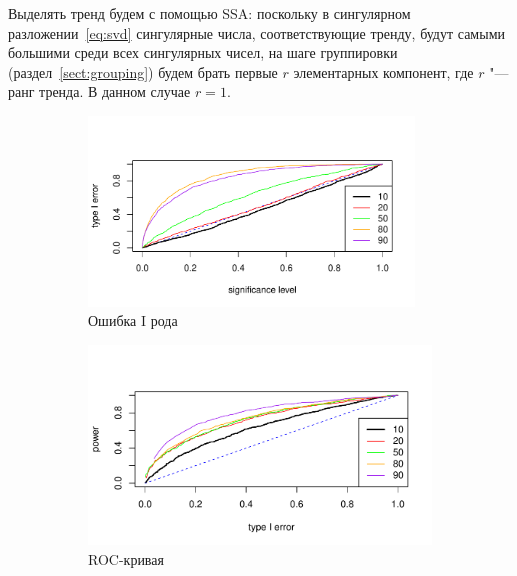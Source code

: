 \documentclass[specialist,
substylefile = spbu_report.rtx,
subf,href,colorlinks=true, 12pt]{disser}
\theoremstyle{definition}
\begin{document}
Выделять тренд будем с помощью SSA: поскольку в сингулярном разложении~\eqref{eq:svd} сингулярные числа, соответствующие тренду, будут самыми большими среди всех сингулярных чисел, на шаге группировки (раздел~\ref{sect:grouping}) будем брать первые $r$ элементарных компонент, где $r$ "--- ранг тренда. В данном случае $r=1$.

\begin{figure}[h!]
	\captionsetup[subfigure]{justification=Centering}
	\begin{subfigure}[t]{0.5\textwidth}
		\centering
		\includegraphics[width=0.95\textwidth]{img/type1error_trend.pdf}
		\caption{Ошибка I рода}
		\label{fig:trend_type1error}
	\end{subfigure}\hspace{\fill}
	\begin{subfigure}[t]{0.5\textwidth}
		\centering
		\includegraphics[width=\textwidth]{img/roc_trend.pdf}
		\caption{ROC-кривая}
		\label{fig:trend_roc}
	\end{subfigure}
	\begin{subfigure}[t]{0.5\textwidth}
		\centering

\end{subfigure}
\end{figure}
\end{document}
